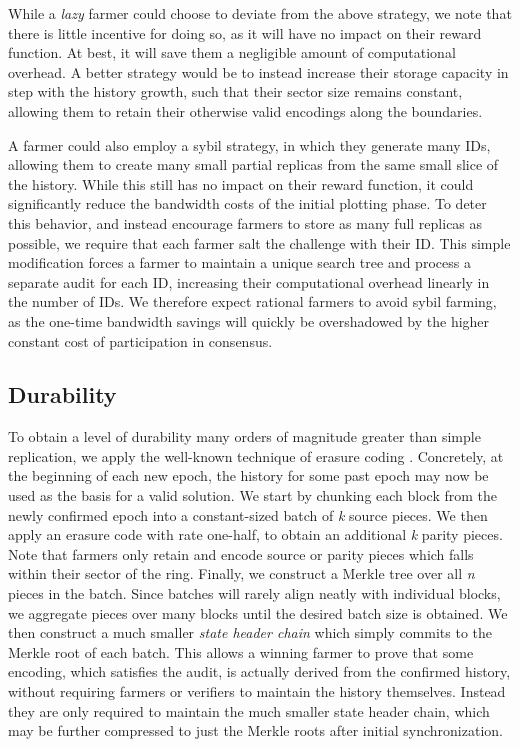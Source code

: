 \documentclass[conference]{IEEEtran}
\begin{document}
While a \textit{lazy} farmer could choose to deviate from the above strategy, we note that there is little incentive for doing so, as it will have no impact on their reward function. At best, it will save them a negligible amount of computational overhead. A better strategy would be to instead increase their storage capacity in step with the history growth, such that their sector size remains constant, allowing them to retain their otherwise valid encodings along the boundaries.  

A farmer could also employ a sybil strategy, in which they generate many IDs, allowing them to create many small partial replicas from the same small slice of the history. While this still has no impact on their reward function, it could significantly reduce the bandwidth costs of the initial plotting phase. To deter this behavior, and instead encourage farmers to store as many full replicas as possible, we require that each farmer salt the challenge with their ID. This simple modification forces a farmer to maintain a unique search tree and process a separate audit for each ID, increasing their computational overhead linearly in the number of IDs. We therefore expect rational farmers to avoid sybil farming, as the one-time bandwidth savings will quickly be overshadowed by the higher constant cost of participation in consensus. 

\subsection{Durability}

To obtain a level of durability many orders of magnitude greater than simple replication, we apply the well-known technique of erasure coding \cite{reed1960polynomial}. Concretely, at the beginning of each new epoch, the history for some past epoch may now be used as the basis for a valid solution. We start by chunking each block from the newly confirmed epoch into a constant-sized batch of \textit{k} source pieces. We then apply an erasure code with rate one-half, to obtain an additional \textit{k} parity pieces. Note that farmers only retain and encode source or parity pieces which falls within their sector of the ring. Finally, we  construct a Merkle tree over all \textit{n} pieces in the batch. Since batches will rarely align neatly with individual blocks, we aggregate pieces over many blocks until the desired batch size is obtained. We then construct a much smaller \textit{state header chain} which simply commits to the Merkle root of each batch. This allows a winning farmer to prove that some encoding, which satisfies the audit, is actually derived from the confirmed history, without requiring farmers or verifiers to maintain the history themselves. Instead they are only required to maintain the much smaller state header chain, which may be further compressed to just the Merkle roots after initial synchronization.    
\end{document}
